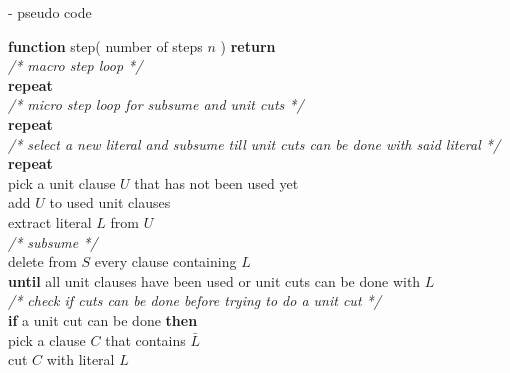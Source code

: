 - pseudo code
\begin{listing}[h!]
    \textbf{function} step( number of steps $n$ ) \textbf{return}\\
        \hspace*{0.5cm} \textit{/* macro step loop */}\\
        \hspace*{0.5cm} \textbf{repeat}\\
            \hspace*{1.0cm} \textit{/* micro step loop for subsume and unit cuts */}\\
            \hspace*{1.0cm} \textbf{repeat}\\
                \hspace*{1.5cm} \textit{/* select a new literal and subsume till unit cuts can be done with said literal */}\\
                \hspace*{1.5cm} \textbf{repeat}\\
                    \hspace*{2cm} pick a unit clause $U$ that has not been used yet\\
                    \hspace*{2cm} add $U$ to used unit clauses\\
                    \hspace*{2cm} extract literal $L$ from $U$\\
                    \hspace*{2cm} \textit{/* subsume */}\\
                    \hspace*{2cm} delete from $S$ every clause containing $L$\\
                \hspace*{1.5cm} \textbf{until} all unit clauses have been used or unit cuts can be done with $L$\\
                \hspace*{1.5cm} \textit{/* check if cuts can be done before trying to do a unit cut */}\\
                \hspace*{1.5cm} \textbf{if} a unit cut can be done \textbf{then}\\
                    \hspace*{2cm} pick a clause $C$ that contains $\bar{L}$\\
                    \hspace*{2cm} cut $C$ with literal $L$\\

\end{listing}

